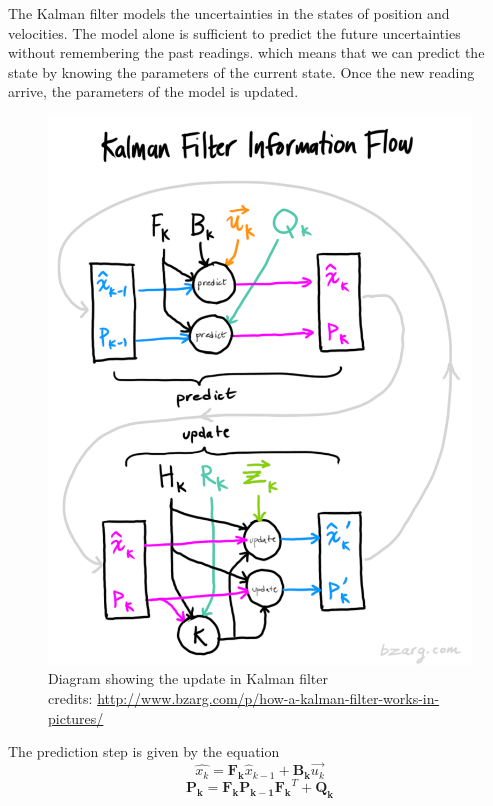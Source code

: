 \documentclass[12pt,twocolumn,letterpaper]{article}
\begin{document}
The Kalman filter models the uncertainties  in the states of position and velocities. The model alone is sufficient to predict the future uncertainties without remembering the past readings. which means that we can predict the state by knowing the parameters of the current state. Once the new reading arrive, the parameters of the model is updated.

\begin{figure}
\includegraphics[scale=0.3]{images/kalflow}
\caption{Diagram showing the update in Kalman filter\\ credits: \url{http://www.bzarg.com/p/how-a-kalman-filter-works-in-pictures/}}
\end{figure}

The prediction step is given by the equation
\begin{equation}
\hat{x_k} = \mathbf{F_k} \hat{x}_{k-1} + \mathbf{B_k} \vec{u_k}
\label{eqn:stateestimate}
\end{equation}
\begin{equation}
\mathbf{P_k} = \mathbf{F_k} \mathbf{P_{k-1}} \mathbf{F_k}^T + \mathbf{Q_k}
\label{eqn:estimatecovariance}
\end{equation}
\end{document}
